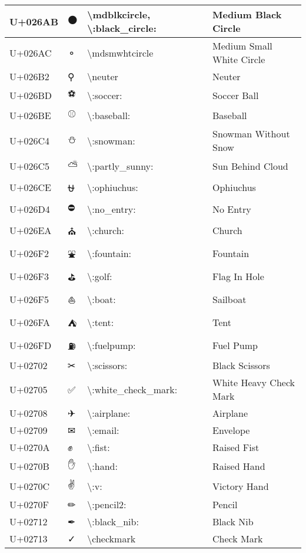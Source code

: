 \begin{table}[h]
\begin{tabulary}{\linewidth}{|L|L|L|L|}
\hline
U+026AB & ⚫ & {\textbackslash}mdblkcircle, {\textbackslash}:black\_circle: & Medium Black Circle \\
\hline
U+026AC & ⚬ & {\textbackslash}mdsmwhtcircle & Medium Small White Circle \\
\hline
U+026B2 & ⚲ & {\textbackslash}neuter & Neuter \\
\hline
U+026BD & ⚽ & {\textbackslash}:soccer: & Soccer Ball \\
\hline
U+026BE & ⚾ & {\textbackslash}:baseball: & Baseball \\
\hline
U+026C4 & ⛄ & {\textbackslash}:snowman: & Snowman Without Snow \\
\hline
U+026C5 & ⛅ & {\textbackslash}:partly\_sunny: & Sun Behind Cloud \\
\hline
U+026CE & ⛎ & {\textbackslash}:ophiuchus: & Ophiuchus \\
\hline
U+026D4 & ⛔ & {\textbackslash}:no\_entry: & No Entry \\
\hline
U+026EA & ⛪ & {\textbackslash}:church: & Church \\
\hline
U+026F2 & ⛲ & {\textbackslash}:fountain: & Fountain \\
\hline
U+026F3 & ⛳ & {\textbackslash}:golf: & Flag In Hole \\
\hline
U+026F5 & ⛵ & {\textbackslash}:boat: & Sailboat \\
\hline
U+026FA & ⛺ & {\textbackslash}:tent: & Tent \\
\hline
U+026FD & ⛽ & {\textbackslash}:fuelpump: & Fuel Pump \\
\hline
U+02702 & ✂ & {\textbackslash}:scissors: & Black Scissors \\
\hline
U+02705 & ✅ & {\textbackslash}:white\_check\_mark: & White Heavy Check Mark \\
\hline
U+02708 & ✈ & {\textbackslash}:airplane: & Airplane \\
\hline
U+02709 & ✉ & {\textbackslash}:email: & Envelope \\
\hline
U+0270A & ✊ & {\textbackslash}:fist: & Raised Fist \\
\hline
U+0270B & ✋ & {\textbackslash}:hand: & Raised Hand \\
\hline
U+0270C & ✌ & {\textbackslash}:v: & Victory Hand \\
\hline
U+0270F & ✏ & {\textbackslash}:pencil2: & Pencil \\
\hline
U+02712 & ✒ & {\textbackslash}:black\_nib: & Black Nib \\
\hline
U+02713 & ✓ & {\textbackslash}checkmark & Check Mark \\

\end{tabulary}
\end{table}
